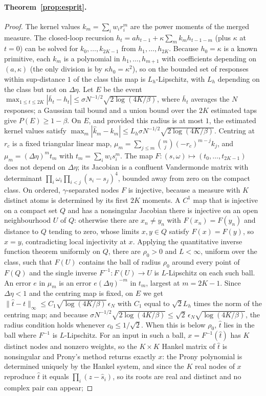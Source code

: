 \documentclass[12pt]{article}
\theoremstyle{definition}
\theoremstyle{remark}
\begin{document}
\paragraph{Theorem~\ref{prop:esprit}.}
\begin{proof}
The kernel values $k_m=\sum_iw_ir_i^m$ are the power moments of the merged measure. The closed-loop recursion $h_t=ah_{t-1}+\kappa\sum_mk_mh_{t-1-m}$ (plus $\kappa$ at $t=0$) can be solved for $k_0,\ldots,k_{2K-1}$ from $h_1,\ldots,h_{2K}$. Because $h_0=\kappa$ is a known primitive, each $k_m$ is a polynomial in $h_1,\ldots,h_{m+1}$ with coefficients depending on $(a,\kappa)$ (the only division is by $\kappa h_0=\kappa^2$), so on the bounded set of responses within sup-distance $1$ of the class this map is $L_h$-Lipschitz, with $L_h$ depending on the class but not on $\Delta\eta$. Let $E$ be the event $\max_{1\le t\le2K}|\bar h_t-h_t|\le\sigma N^{-1/2}\sqrt{2\log(4K/\beta)}$, where $\bar h_t$ averages the $N$ responses; a Gaussian tail bound and a union bound over the $2K$ estimated taps give $P(E)\ge1-\beta$. On $E$, and provided this radius is at most $1$, the estimated kernel values satisfy $\max_m|\hat k_m-k_m|\le L_h\sigma N^{-1/2}\sqrt{2\log(4K/\beta)}$. Centring at $r_c$ is a fixed triangular linear map, $\mu_m=\sum_{j\le m}\binom mj(-r_c)^{m-j}k_j$, and $\mu_m=(\Delta\eta)^m t_m$ with $t_m=\sum_iw_is_i^m$. The map $F:(s,\omega)\mapsto(t_0,\ldots,t_{2K-1})$ does not depend on $\Delta\eta$; its Jacobian is a confluent Vandermonde matrix with determinant $\prod_i\omega_i\prod_{i<j}(s_i-s_j)^4$, bounded away from zero on the compact class. On ordered, $\gamma$-separated nodes $F$ is injective, because a measure with $K$ distinct atoms is determined by its first $2K$ moments. A $C^1$ map that is injective on a compact set $Q$ and has a nonsingular Jacobian there is injective on an open neighbourhood $U$ of $Q$: otherwise there are $x_n\ne y_n$ with $F(x_n)=F(y_n)$ and distance to $Q$ tending to zero, whose limits $x,y\in Q$ satisfy $F(x)=F(y)$, so $x=y$, contradicting local injectivity at $x$. Applying the quantitative inverse function theorem uniformly on $Q$, there are $\rho_0>0$ and $L<\infty$, uniform over the class, such that $F(U)$ contains the ball of radius $\rho_0$ around every point of $F(Q)$ and the single inverse $F^{-1}:F(U)\to U$ is $L$-Lipschitz on each such ball. An error $e$ in $\mu_m$ is an error $e(\Delta\eta)^{-m}$ in $t_m$, largest at $m=2K-1$. Since $\Delta\eta<1$ and the centring map is fixed, on $E$ we get $\|\hat t-t\|_\infty\le C_1\sqrt{\log(4K/\beta)}\,\epsilon_N$ with $C_1$ equal to $\sqrt2L_h$ times the norm of the centring map; and because $\sigma N^{-1/2}\sqrt{2\log(4K/\beta)}\le\sqrt2\,\epsilon_N\sqrt{\log(4K/\beta)}$, the radius condition holds whenever $c_0\le1/\sqrt2$. When this is below $\rho_0$, $\hat t$ lies in the ball where $F^{-1}$ is $L$-Lipschitz. For an input in such a ball, $x=F^{-1}(\hat t)$ has $K$ distinct nodes and nonzero weights, so the $K\times K$ Hankel matrix of $\hat t$ is nonsingular and Prony's method returns exactly $x$: the Prony polynomial is determined uniquely by the Hankel system, and since the $K$ real nodes of $x$ reproduce $\hat t$ it equals $\prod_i(z-\hat s_i)$, so its roots are real and distinct and no complex pair can appear; 
\end{proof}
\end{document}
